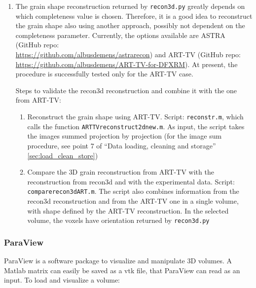 \documentclass[11pt]{scrartcl}
\begin{document}
\begin{enumerate}
    \item The grain shape reconstruction returned by {\texttt{recon3d.py}} greatly depends on which completeness value is chosen. Therefore, it is a good idea to reconstruct the grain shape also using another approach, possibly not dependent on the completeness parameter. Currently, the options available are {\footnotesize{ASTRA}} (GitHub repo: \\ \href{https://github.com/albusdemens/astrarecon}{https://github.com/albusdemens/astrarecon}) and {\footnotesize{ART-TV}} (GitHub repo: \\ \href{https://github.com/albusdemens/ART-TV-for-DFXRM}{https://github.com/albusdemens/ART-TV-for-DFXRM}). At present, the procedure is successfully tested only for the {\footnotesize{ART-TV}} case.

    Steps to validate the recon3d reconstruction and combine it with the one from {\footnotesize{ART-TV}}:
    \begin{enumerate}
        \item Reconstruct the grain shape using {\footnotesize{ART-TV}}. Script: {\texttt{reconstr.m}}, which calls the function {\texttt{ART\textunderscore TV\textunderscore reconstruct\textunderscore 2d\textunderscore new.m}}. As input, the script takes the images summed projection by projection (for the image sum procedure, see point 7 of ``Data loading, cleaning and storage'' \ref{sec:load_clean_store})
        \item Compare the {\footnotesize{3D}} grain reconstruction from {\footnotesize{ART-TV}} with the reconstruction from recon3d and with the experimental data. Script: {\texttt{compare\textunderscore recon3d\textunderscore ART.m}}. The script also combines information from the recon3d reconstruction and from the {\footnotesize{ART-TV}} one in a single volume, with shape defined by the {\footnotesize{ART-TV}} reconstruction. In the selected volume, the voxels have orientation returned by {\texttt{recon3d.py}}
    \end{enumerate}
\end{enumerate}

\subsubsection{ParaView}

ParaView is a software package to visualize and manipulate {\footnotesize{3D}} volumes. A Matlab matrix can easily be saved as a vtk file, that ParaView can read as an input. To load and visualize a volume:
\end{document}
